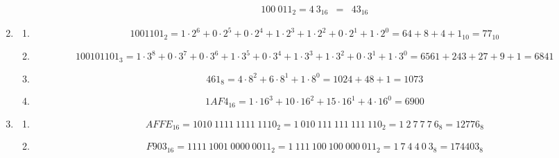 \documentclass[DIN, pagenumber=false, fontsize=11pt, parskip=half]{scrartcl}
\begin{document}
\begin{enumerate}
\begin{enumerate}
\begin{eqnarray*}
                        {100\ 011}_2 = {4\ 3}_{16} &=& {43}_{16}
                    \end{eqnarray*}
            \end{enumerate}
        \item 
            \begin{enumerate}
                \item 
                    \begin{equation*}
                        {1001101}_2 = 1\cdot2^6 + 0\cdot2^5 + 0\cdot2^4 + 1\cdot2^3 + 1\cdot2^2 + 0\cdot2^1 + 1\cdot2^0 = {64 + 8 + 4 + 1}_{10} = {77}_{10}
                    \end{equation*}
                \item 
                    \begin{equation*}
                        {100101101}_3 = 1\cdot3^8 + 0\cdot3^7 + 0\cdot3^6 + 1\cdot3^5 + 0\cdot3^4 + 1\cdot3^3 + 1\cdot3^2 + 0\cdot3^1 + 1\cdot3^0 = 6561 + 243 + 27 + 9 + 1 = 6841
                    \end{equation*}
                \item 
                    \begin{equation*}
                        {461}_{8} = 4\cdot8^2 + 6\cdot8^1 + 1\cdot8^0 = 1024 + 48 + 1 = 1073
                    \end{equation*}
                \item 
                    \begin{equation*}
                        {1AF4}_{16} = 1\cdot16^3 + 10\cdot16^2 + 15\cdot16^1 + 4\cdot16^0 = 6900
                    \end{equation*}
            \end{enumerate}
        \item 
            \begin{enumerate}
                \item 
                    \begin{equation*}
                        {AFFE}_{16} = {1010\ 1111\ 1111\ 1110}_2 = {1\ 010\ 111\ 111\ 111\ 110}_2 = {1\ 2\ 7\ 7\ 7\ 6}_8 = {12776}_8
                    \end{equation*}
                \item
                    \begin{equation*}
                        {F903}_{16} = {1111\ 1001\ 0000\ 0011}_2 = {1\ 111\ 100\ 100\ 000\ 011}_2 = {1\ 7\ 4\ 4\ 0\ 3}_8 = {174403}_8
                    \end{equation*}

\end{enumerate}
\end{enumerate}
\end{document}

